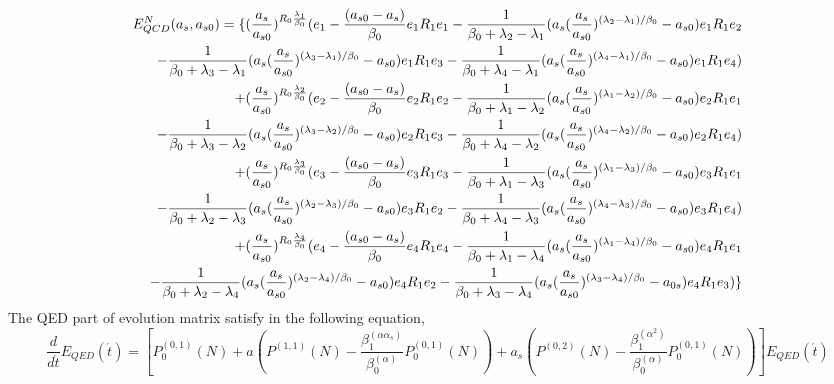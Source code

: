 \documentclass[review]{elsarticle}
\begin{document}
\begin{eqnarray}
E_{QCD}^{N}(a_{s},a_{s0})=\{(\frac{a_{s}}{a_{s0}})^{R_0\frac{\lambda_{1}}{ \beta_{0}}}(e_{1}-\frac{(\text{\ensuremath{a_{s0}-a_{s})}}}{\text{\ensuremath{\beta_{0}}}}e_{1}R_1e_{1}-\frac{1}{\beta_{0}+\lambda_{2}-\lambda_{1}}(a_{s}(\frac{a_{s}}{a_{s0}})^{(\lambda_{2}-\lambda_{1})/\beta_{0}}-a_{s0})e_{1}R_1e_{2}\cr
-\frac{1}{\beta_{0}+\lambda_{3}-\lambda_{1}}(a_{s}(\frac{a_{s}}{a_{s0}})^{(\lambda_{3}-\lambda_{1})/\beta_{0}}-a_{s0})e_{1}R_1e_{3}-\frac{1}{\beta_{0}+\lambda_{4}-\lambda_{1}}(a_{s}(\frac{a_{s}}{a_{s0}})^{(\lambda_{4}-\lambda_{1})/\beta_{0}}-a_{s0})e_{1}R_1e_{4})\cr
+(\frac{a_{s}}{a_{s0}})^{R_0\frac{\lambda_{2}}{\beta_{0}}}(e_{2}-\frac{(\text{\ensuremath{a_{s0}-a_{s})}}}{\text{\ensuremath{\beta_{0}}}}e_{2}R_1e_{2}-\frac{1}{\beta_{0}+\lambda_{1}-\lambda_{2}}(a_{s}(\frac{a_{s}}{a_{s0}})^{(\lambda_{1}-\lambda_{2})/\beta_{0}}-a_{s0})e_{2}R_1e_{1}\cr
-\frac{1}{\beta_{0}+\lambda_{3}-\lambda_{2}}(a_{s}(\frac{a_{s}}{a_{s0}})^{(\lambda_{3}-\lambda_{2})/\beta_{0}}-a_{s0})e_{2}R_1e_{3}-\frac{1}{\beta_{0}+\lambda_{4}-\lambda_{2}}(a_{s}(\frac{a_{s}}{a_{s0}})^{(\lambda_{4}-\lambda_{2})/\beta_{0}}-a_{s0})e_{2}R_1e_{4})\cr
+(\frac{a_{s}}{a_{s0}})^{R_0\frac{\lambda_{3}}{\beta_{0}}}(e_{3}-\frac{(\text{\ensuremath{a_{s0}-a_{s})}}}{\text{\ensuremath{\beta_{0}}}}e_{3}R_1e_{3}-\frac{1}{\beta_{0}+\lambda_{1}-\lambda_{3}}(a_{s}(\frac{a_{s}}{a_{s0}})^{(\lambda_{1}-\lambda_{3})/\beta_{0}}-a_{s0})e_{3}R_1e_{1}\cr
-\frac{1}{\beta_{0}+\lambda_{2}-\lambda_{3}}(a_{s}(\frac{a_{s}}{a_{s0}})^{(\lambda_{2}-\lambda_{3})/\beta_{0}}-a_{s0})e_{3}R_1e_{2}-\frac{1}{\beta_{0}+\lambda_{4}-\lambda_{3}}(a_{s}(\frac{a_{s}}{a_{s0}})^{(\lambda_{4}-\lambda_{3})/\beta_{0}}-a_{s0})e_{3}R_1e_{4})\cr
+(\frac{a_{s}}{a_{s0}})^{R_0\frac{\lambda_{4}}{\beta_{0}}}(e_{4}-\frac{(\text{\ensuremath{a_{s0}-a_{s})}}}{\text{\ensuremath{\beta_{0}}}}e_{4}R_1e_{4}-\frac{1}{\beta_{0}+\lambda_{1}-\lambda_{4}}(a_{s}(\frac{a_{s}}{a_{s0}})^{(\lambda_{1}-\lambda_{4})/\beta_{0}}-a_{s0})e_{4}R_1e_{1}\cr
-\frac{1}{\beta_{0}+\lambda_{2}-\lambda_{4}}(a_{s}(\frac{a_{s}}{a_{s0}})^{(\lambda_{2}-\lambda_{4})/\beta_{0}}-a_{s0})e_{4}R_1e_{2}-\frac{1}{\beta_{0}+\lambda_{3}-\lambda_{4}}(a_{s}(\frac{a_{s}}{a_{s0}})^{(\lambda_{3}-\lambda_{4})/\beta_{0}}-a_{0s})e_{4}R_1e_{3})\}\label{eq:45}
\end{eqnarray} 
The QED part of evolution matrix satisfy in the following equation,
\begin{equation}
\frac{d}{d\acute{t}}E_{QED}(\acute{t})=\left[P_{0}^{(0,1)}(N)+a(P^{(1,1)}(N)-\frac{\beta_{1}^{(\alpha \alpha_s)}}{\beta_0^{(\alpha)}}P_{0}^{(0,1)}(N))+a_{s}(P^{(0,2)}(N)-\frac{\beta_{1}^{(\alpha^2)}}{\beta_0^{(\alpha)}}P_{0}^{(0,1)}(N))\right]E_{QED}(\acute{t})\label{eq:46}
\end{equation} 
\end{document}
